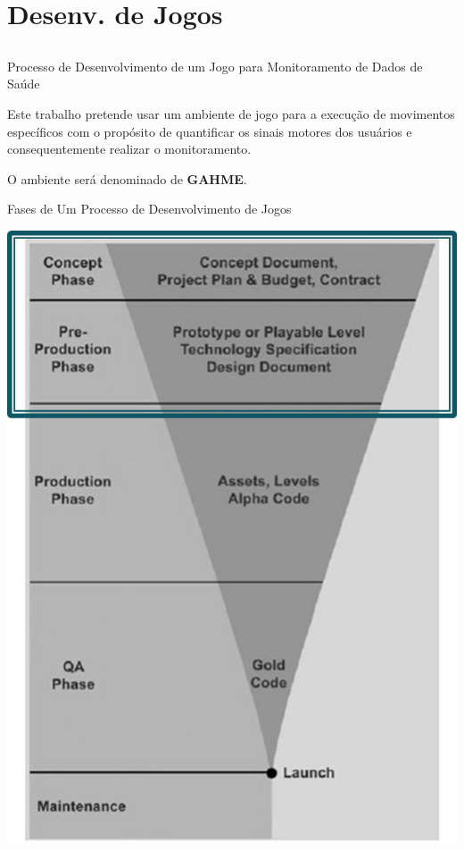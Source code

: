 \documentclass{beamer}
\begin{document}
\section{Desenv. de Jogos}
\subsection{}


\begin{frame}{Processo de Desenvolvimento de um Jogo para Monitoramento de Dados de Saúde}
\begin{block}{}
Este trabalho pretende usar um ambiente de jogo para a execução de movimentos específicos com o propósito de quantificar os sinais motores dos usuários e consequentemente realizar o monitoramento. 
\end{block}
\begin{block}{}
O ambiente será denominado de \textbf{GAHME}.
\end{block}
\end{frame}

\begin{frame}{Fases de Um Processo de Desenvolvimento de Jogos}
  \begin{block}{}
      \center \includegraphics[height=2.8 in]{img/stages-game-development.png}
  \end{block}
\end{frame}
\end{document}
